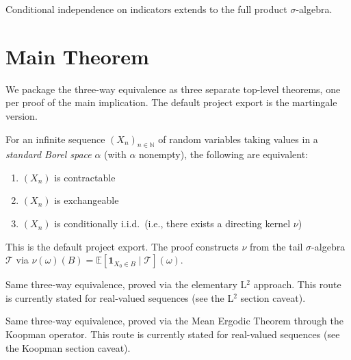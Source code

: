 \begin{theorem}
  \label{thm:condIndep_extension}
  \leanok
  Conditional independence on indicators extends to the full product $\sigma$-algebra.
\end{theorem}


\chapter{Main Theorem}

We package the three-way equivalence as three separate top-level theorems, one per
proof of the main implication. The default project export is the martingale version.

\begin{theorem}
  \label{thm:deFinetti}
  \leanok
  For an infinite sequence $(X_n)_{n \in \mathbb{N}}$ of random variables taking values
  in a \emph{standard Borel space} $\alpha$ (with $\alpha$ nonempty), the following are equivalent:
  \begin{enumerate}
    \item $(X_n)$ is contractable
    \item $(X_n)$ is exchangeable
    \item $(X_n)$ is conditionally i.i.d.\ (i.e., there exists a directing kernel $\nu$)
  \end{enumerate}
  This is the default project export. The proof constructs $\nu$ from the tail
  $\sigma$-algebra $\mathcal{T}$ via
  $\nu(\omega)(B) = \mathbb{E}[\mathbf{1}_{X_0 \in B} \mid \mathcal{T}](\omega)$.
\end{theorem}

\begin{theorem}
  \label{thm:deFinetti_viaL2}
  \leanok
  Same three-way equivalence, proved via the elementary L$^2$ approach. This route
  is currently stated for real-valued sequences (see the L$^2$ section caveat).
\end{theorem}

\begin{theorem}
  \label{thm:deFinetti_viaKoopman}
  \leanok
  Same three-way equivalence, proved via the Mean Ergodic Theorem through the Koopman
  operator. This route is currently stated for real-valued sequences (see the Koopman
  section caveat).
\end{theorem}
